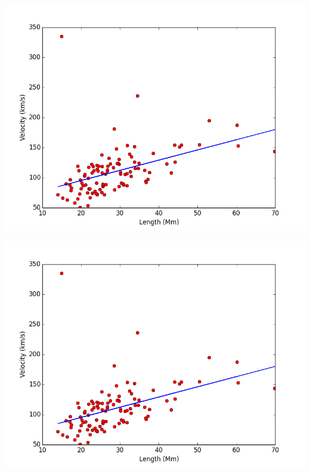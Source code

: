 \documentclass{beamer}
\begin{document}
	\begin{frame}
		\begin{minipage}{0.49\textwidth}
			\begin{flushleft}
				\includegraphics[width=1\textwidth]{Figs/length_max_vs.png}
			\end{flushleft}
		\end{minipage}
		\begin{minipage}{0.49\textwidth}
			\begin{center}
				\includegraphics[width=1\textwidth]{Figs/length_max_vs.png}
			\end{center}
		\end{minipage}\\
		\begin{minipage}{0.49\textwidth}

\end{minipage}
\end{frame}
\end{document}

